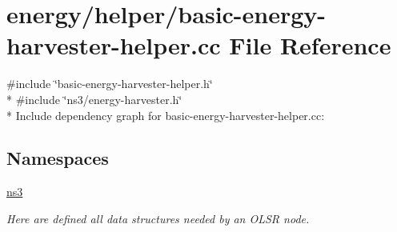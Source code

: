 \hypertarget{basic-energy-harvester-helper_8cc}{}\section{energy/helper/basic-\/energy-\/harvester-\/helper.cc File Reference}
\label{basic-energy-harvester-helper_8cc}
{\ttfamily \#include \char`\"{}basic-\/energy-\/harvester-\/helper.\+h\char`\"{}}\\*
{\ttfamily \#include \char`\"{}ns3/energy-\/harvester.\+h\char`\"{}}\\*
Include dependency graph for basic-\/energy-\/harvester-\/helper.cc\+:
\subsection*{Namespaces}
\begin{DoxyCompactItemize}
\item 
 \hyperlink{namespacens3}{ns3}
\begin{DoxyCompactList}\small\item\em Here are defined all data structures needed by an O\+L\+SR node. \end{DoxyCompactList}\end{DoxyCompactItemize}
